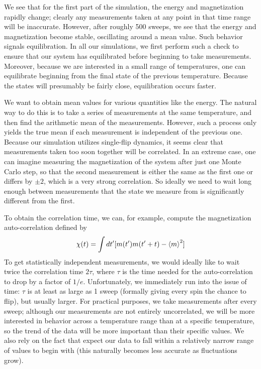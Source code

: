 \documentclass[twocolumn,aps,prl]{revtex4-1} %
\begin{document}
We see that for the first part of the simulation, the energy and magnetization rapidly change; clearly any measurements taken at any point in that time range will be inaccurate. However, after roughly 500 sweeps, we see that the energy and magnetization become stable, oscillating around a mean value. Such behavior signals equilibration. In all our simulations, we first perform such a check to ensure that our system has equilibrated before beginning to take measurements. Moreover, because we are interested in a small range of temperatures, one can equilibrate beginning from the final state of the previous temperature. Because the states will presumably be fairly close, equilibration occurs faster.

We want to obtain mean values for various quantities like the energy. The natural way to do this is to take a series of measurements at the same temperature, and then find the arithmetic mean of the measurements. However, such a process only yields the true mean if each measurement is independent of the previous one. Because our simulation utilizes single-flip dynamics, it seems clear that measurements taken too soon together will be correlated. In an extreme case, one can imagine measuring the magnetization of the system after just one Monte Carlo step, so that the second measurement is either the same as the first one or differs by $\pm 2$, which is a very strong correlation. So ideally we need to wait long enough between measurements that the state we measure from is significantly different from the first.

To obtain the correlation time, we can, for example, compute the magnetization auto-correlation defined by
\begin{align}
\chi(t) = \int dt'[m(t')m(t'+t)-\braket{m}^2]
\end{align}
To get statistically independent measurements, we would ideally like to wait twice the correlation time $2\tau$, where $\tau$ is the time needed for the auto-correlation to drop by a factor of ${1}/{e}$. Unfortunately, we immediately run into the issue of time: $\tau$ is at least as large as 1 sweep (formally giving every spin the chance to flip), but usually larger. For practical purposes, we take measurements after every sweep; although our measurements are not entirely uncorrelated, we will be more interested in behavior across a temperature range than at a specific temperature, so the trend of the data will be more important than their specific values. We also rely on the fact that expect our data to fall within a relatively narrow range of values to begin with (this naturally becomes less accurate as fluctuations grow).
\end{document}

